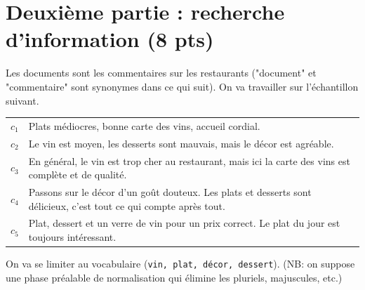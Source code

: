 \documentclass[10pt,a4paper]{article}
\begin{document}
\section*{Deuxième partie : recherche d'information (8 pts)}

Les documents sont les commentaires sur les restaurants ("document" et "commentaire"
sont synonymes dans ce qui suit). On va travailler sur l'échantillon
suivant.

\vspace*{0.3cm}

\begin{tabular}{lp{15cm}}
     $c_1$& Plats médiocres, bonne carte des vins, accueil cordial.\\
     $c_2$& Le vin est moyen, les desserts sont mauvais, mais le décor est agréable.\\
     $c_3$& En général, le vin est trop cher au restaurant, mais ici la carte
         des vins est complète et de qualité.\\
     $c_4$& Passons sur le décor d'un goût douteux. Les plats et desserts sont délicieux,
          c'est tout ce qui compte après tout.\\
     $c_5$& Plat, dessert et un verre de vin pour un prix correct. Le plat du jour
             est toujours intéressant.\\ 
\end{tabular}

\bigskip

On va se limiter au vocabulaire (\texttt{vin, plat, décor, dessert}).
(NB: on suppose
     une phase préalable de normalisation qui élimine les pluriels, majuscules, etc.)
\end{document}
